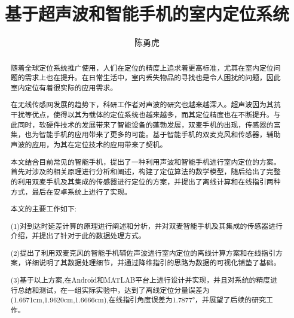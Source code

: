 \documentclass[winfonts,oneside]{njuthesis}
\title{基于超声波和智能手机的室内定位系统}
\author{陈勇虎}
\begin{document}
\maketitle
\makeenglishtitle

\begin{abstract}
	
	随着全球定位系统推广使用，人们在定位的精度上追求着更高标准，尤其在室内定位问题的需求上也在提升。在日常生活中，室内丢失物品的寻找也是令人困扰的问题，因此室内定位有着很实际的应用需求。
	
	在无线传感网发展的趋势下，科研工作者对声波的研究也越来越深入。超声波因为其抗干扰等优点，使得以其为载体的定位系统也越来越多，而其定位精度也在不断提升。与此同时，软硬件技术的发展带来了智能设备的蓬勃发展，双麦手机的出现，传感器的富集，也为智能手机的应用带来了更多的可能。基于智能手机的双麦克风和传感器，辅助声波的应用，为其在定位技术的应用带来了契机。
	
	本文结合目前常见的智能手机，提出了一种利用声波和智能手机进行室内定位的方案。首先对涉及的相关原理进行分析和阐述，构建了定位算法的数学模型，随后给出了完整的利用双麦手机及其集成的传感器进行定位的方案，并提出了离线计算和在线指引两种方式，最后在安卓系统上进行了实现。
	
	本文的主要工作如下:
	
	(1)对到达时延差计算的原理进行阐述和分析，并对双麦智能手机及其集成的传感器进行介绍，并提出了针对于此的数据处理方式。
	
	(2)提出了利用双麦克风的智能手机辅佐声波进行室内定位的离线计算方案和在线指引方案，详细说明了其数据处理细节，并通过降维指引的思路为数据的可视化铺垫了基础。
	
	(3)基于以上方案,在Android和MATLAB平台上进行设计并实现，并且对系统的精度进行总结和测试，在一组实际实验中，达到了离线定位分量误差为(1.6671cm,1.9620cm,1.6666cm),在线指引角度误差为1.7877°，并展望了后续的研究工作。

\end{abstract}
\end{document}
